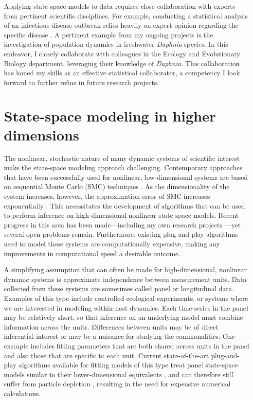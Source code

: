 \documentclass{article}
\begin{document}
Applying state-space models to data requires close collaboration with experts from pertinent scientific disciplines.
For example, conducting a statistical analysis of an infectious disease outbreak relies heavily on expert opinion regarding the specific disease \cite{wheeler24}.
A pertinent example from my ongoing projects is the investigation of population dynamics in freshwater \emph{Daphnia} species.
In this endeavor, I closely collaborate with colleagues in the Ecology and Evolutionary Biology department, leveraging their knowledge of \emph{Daphnia}.
This collaboration has honed my skills as an effective statistical collaborator, a competency I look forward to further refine in future research projects.


\section{State-space modeling in higher dimensions}\label{sec:methods}

The nonlinear, stochastic nature of many dynamic systems of scientific interest make the state-space modeling approach challenging.
Contemporary approaches that have been successfully used for nonlinear, low-dimensional systems are based on sequential Monte Carlo (SMC) techniques \cite{ionides06,andrieu10,ionides15}.
As the dimensionality of the system increases, however, the approximation error of SMC increases exponentially \cite{bengtsson08,snyder08}.
This necessitates the development of algorithms that can be used to perform inference on high-dimensional nonlinear state-space models.
Recent progress in this area has been made---including my own research projects \cite{ionides22,wheeler24}---yet several open problems remain.
Furthermore, existing plug-and-play algorithms used to model these systems are computationally expensive, making any improvements in computational speed a desirable outcome.

A simplifying assumption that can often be made for high-dimensional, nonlinear dynamic systems is approximate independence between measurement units.
Data collected from these systems are sometimes called panel or longitudinal data.
Examples of this type include controlled ecological experiments, or systems where we are interested in modeling within-host dynamics.
Each time-series in the panel may be relatively short, so that inference on an underlying model must combine information across the units.
Differences between units may be of direct inferential interest or may be a nuisance for studying the commonalities.
One example includes fitting parameters that are both shared across units in the panel and also those that are specific to each unit.
Current state-of-the-art plug-and-play algorithms available for fitting models of this type treat panel state-space models similar to their lower-dimensional equivalents \cite{breto20}, and can therefore still suffer from particle depletion \cite{snyder08}, resulting in the need for expensive numerical calculations.
\end{document}
